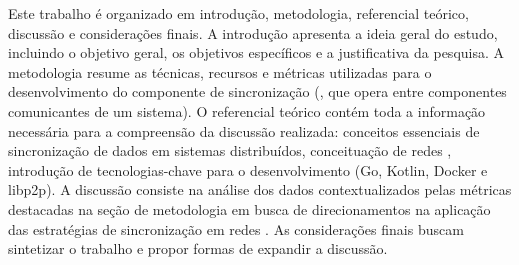 Este trabalho é organizado em introdução, metodologia, referencial teórico, discussão e considerações finais. A introdução apresenta a ideia geral do estudo, incluindo o objetivo geral, os objetivos específicos e a justificativa da pesquisa. A metodologia resume as técnicas, recursos e métricas utilizadas para o desenvolvimento do componente de sincronização (,  que opera entre componentes comunicantes de um sistema). O referencial teórico contém toda a informação necessária para a compreensão da discussão realizada: conceitos essenciais de sincronização de dados em sistemas distribuídos, conceituação de redes , introdução de tecnologias-chave para o desenvolvimento (Go, Kotlin, Docker e libp2p). A discussão consiste na análise dos dados contextualizados pelas métricas destacadas na seção de metodologia em busca de direcionamentos na aplicação das estratégias de sincronização em redes . As considerações finais buscam sintetizar o trabalho e propor formas de expandir a discussão.
